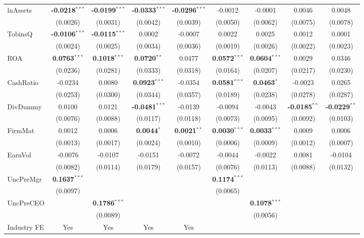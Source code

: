 \documentclass[11pt,a4paper]{article}
\begin{document}
\begin{table}[htbp]
\begin{tabular}{lcccccccc}
lnAssets & \textbf{-0.0218}$^{***}$ & \textbf{-0.0199}$^{***}$ & \textbf{-0.0333}$^{***}$ & \textbf{-0.0296}$^{***}$ & -0.0012 & -0.0001 & 0.0046 & 0.0048 \\
 & (0.0026) & (0.0031) & (0.0042) & (0.0039) & (0.0050) & (0.0062) & (0.0075) & (0.0078) \\
TobinsQ & \textbf{-0.0106}$^{***}$ & \textbf{-0.0115}$^{***}$ & 0.0002 & -0.0007 & 0.0022 & 0.0025 & 0.0012 & 0.0001 \\
 & (0.0024) & (0.0025) & (0.0034) & (0.0036) & (0.0019) & (0.0026) & (0.0022) & (0.0023) \\
ROA & \textbf{0.0763}$^{***}$ & \textbf{0.1018}$^{***}$ & \textbf{0.0720}$^{**}$ & 0.0477 & \textbf{0.0572}$^{***}$ & \textbf{0.0604}$^{***}$ & 0.0029 & 0.0346 \\
 & (0.0236) & (0.0281) & (0.0333) & (0.0318) & (0.0164) & (0.0207) & (0.0217) & (0.0230) \\
CashRatio & -0.0234 & 0.0080 & \textbf{0.0923}$^{***}$ & -0.0354 & \textbf{0.0581}$^{***}$ & \textbf{0.0463}$^{*}$ & -0.0023 & 0.0265 \\
 & (0.0253) & (0.0300) & (0.0344) & (0.0357) & (0.0189) & (0.0238) & (0.0278) & (0.0287) \\
DivDummy & 0.0100 & 0.0121 & \textbf{-0.0481}$^{***}$ & -0.0139 & -0.0094 & -0.0043 & \textbf{-0.0185}$^{**}$ & \textbf{-0.0229}$^{**}$ \\
 & (0.0076) & (0.0088) & (0.0117) & (0.0118) & (0.0073) & (0.0095) & (0.0092) & (0.0103) \\
FirmMat & 0.0012 & 0.0006 & \textbf{0.0044}$^{*}$ & \textbf{0.0021}$^{**}$ & \textbf{0.0030}$^{***}$ & \textbf{0.0033}$^{***}$ & 0.0009 & 0.0006 \\
 & (0.0013) & (0.0017) & (0.0024) & (0.0010) & (0.0006) & (0.0009) & (0.0012) & (0.0007) \\
EarnVol & -0.0076 & -0.0107 & -0.0151 & -0.0072 & -0.0044 & -0.0022 & 0.0081 & -0.0104 \\
 & (0.0082) & (0.0114) & (0.0179) & (0.0157) & (0.0076) & (0.0113) & (0.0088) & (0.0132) \\
UncPreMgr & \textbf{0.1637}$^{***}$ &  &  &  & \textbf{0.1174}$^{***}$ &  &  &  \\
 & (0.0097) &  &  &  & (0.0065) &  &  &  \\
UncPreCEO &  & \textbf{0.1786}$^{***}$ &  &  &  & \textbf{0.1078}$^{***}$ &  &  \\
 &  & (0.0089) &  &  &  & (0.0056) &  &  \\
\midrule
Industry FE & Yes & Yes & Yes & Yes &  &  &  &  \\

\end{tabular}
\end{table}
\end{document}
